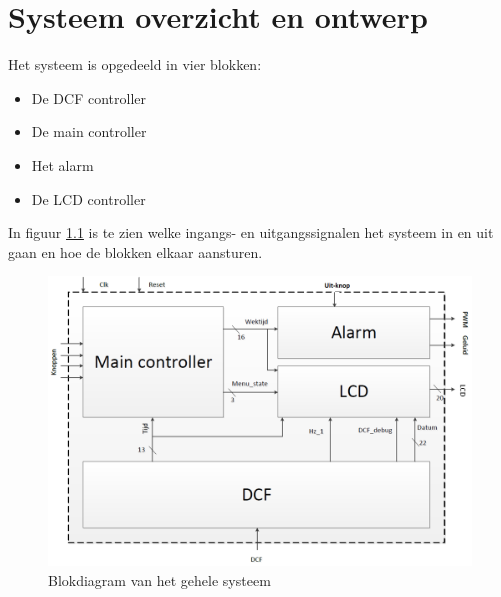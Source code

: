 
\chapter{Systeem overzicht en ontwerp}
Het systeem is opgedeeld in vier blokken:
\begin{itemize}
\item De DCF controller
\item De main controller
\item Het alarm
\item De LCD controller
\end{itemize}

\noindent In figuur \ref{fig:Blokdiagram} is te zien welke ingangs- en uitgangssignalen het systeem in en uit gaan en hoe de blokken elkaar aansturen.

\begin{figure}[h!]
\center
\includegraphics[width=15cm]{Figuren/Blokdiagram}
\caption{Blokdiagram van het gehele systeem}
\label{fig:Blokdiagram}
\end{figure}

